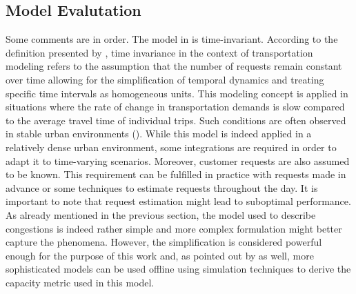 \subsection{Model Evalutation}\label{sec:mode_evaluation_ats}
Some comments are in order. The model in  is time-invariant. According to the definition presented by , time invariance in the context of transportation modeling refers to the assumption that the number of requests remain constant over time allowing for the simplification of temporal dynamics and treating specific time intervals as homogeneous units. This modeling concept is applied in situations where the rate of change in transportation demands is slow compared to the average travel time of individual trips. Such conditions are often observed in stable urban environments (\cite{neuburger1971}). While this model is indeed applied in a relatively dense urban environment, some integrations are required in order to adapt it to time-varying scenarios. Moreover, customer requests are also assumed to be known. This requirement can be fulfilled in practice with requests made in advance or some techniques to estimate requests throughout the day. It is important to note that request estimation might lead to suboptimal performance. \\
As already mentioned in the previous section, the model used to describe congestions is indeed rather simple and more complex formulation might better capture the phenomena. However, the simplification is considered powerful enough for the purpose of this work and, as pointed out by  as well, more sophisticated models can be used offline using simulation techniques to derive the capacity metric used in this model.\\
